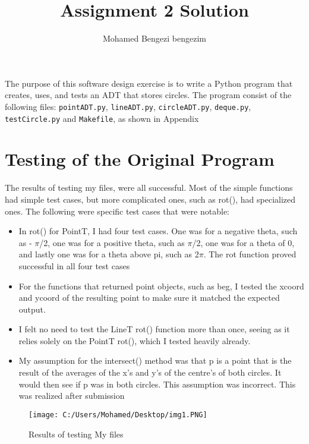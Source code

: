 \documentclass[12pt]{article}
\title{Assignment 2 Solution}
\author{Mohamed Bengezi bengezim}
\begin{document}
\maketitle

The purpose of this software design exercise is to write a Python program that
creates, uses, and tests an ADT that stores circles.  The program consist of the
following files: {\tt pointADT.py}, {\tt lineADT.py}, {\tt circleADT.py}, {\tt deque.py}, {\tt testCircle.py}
and {\tt Makefile}, as shown in Appendix



\section*{Testing of the Original Program}

The results of testing my files, were all successful. Most of the simple functions had simple test cases,
 but more complicated ones, such as rot(), had specialized ones. 
The following were specific test cases that were notable:
\begin{itemize}
\item In rot() for PointT, I had four test cases. One was for a negative theta, such as - $\pi$/2, 
one was for a positive theta, such as $\pi$/2, one was for a theta of 0, and lastly one was for a theta 
above pi, such as 2$\pi$. The rot function proved successful in all four test cases 
\item For the functions that returned point objects, such as beg, I tested the xcoord and ycoord of the
resulting point to make sure it matched the expected output. 
\item I felt no need to test the LineT rot() function more than once, seeing as it relies solely on the PointT rot(),
 which I tested heavily already.
\item My assumption for the intersect() method was that p is a point that is the result of the averages of the
x's and y's of the centre's of both circles. It would then see if p was in both circles. This assumption was
incorrect. This was realized after submission

\end{itemize}


\begin{figure}
\centering
\texttt{[image: C:/Users/Mohamed/Desktop/img1.PNG]}
\caption{Results of testing My files}
\label{Figure : example}
\end{figure}
\end{document}
